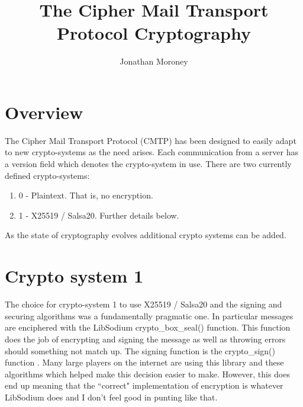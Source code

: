 \documentclass[a4paper,11pt]{article}
\title{The Cipher Mail Transport Protocol Cryptography}
\author{Jonathan Moroney}
\begin{document}
\maketitle


\section{Overview}
The Cipher Mail Transport Protocol (CMTP) has been designed to easily adapt to new crypto-systems as the need arises. Each communication from a server has a version field which denotes the crypto-system in use. There are two currently defined crypto-systems:
\begin{enumerate}
  \item 0 - Plaintext. That is, no encryption.
  \item 1 - X25519 / Salsa20. Further details below.
\end{enumerate}
As the state of cryptography evolves additional crypto systems can be added.

\section{Crypto system 1}
The choice for crypto-system 1 to use X25519 / Salsa20 and the signing and securing algorithms was a fundamentally pragmatic one. In particular messages are enciphered with the LibSodium crypto\_box\_seal() \cite{crypto-box-seal} function. This function does the job of encrypting and signing the message as well as throwing errors should something not match up. The signing function is the crypto\_sign() function \cite{crypto-sign}. Many large players on the internet are using this library and these algorithms which helped make this decision easier to make. However, this does end up meaning that the ``correct" implementation of encryption is whatever LibSodium does and I don't feel good in punting like that.




\end{document}
